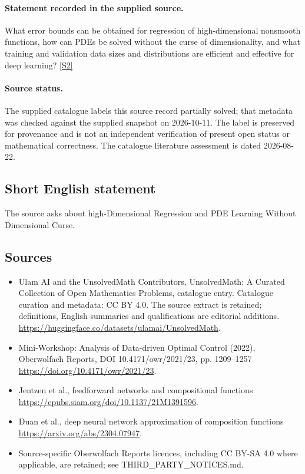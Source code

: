 \documentclass[11pt]{article}
\begin{document}
\paragraph{Statement recorded in the supplied source.}
What error bounds can be obtained for regression of high-dimensional nonsmooth functions, how can PDEs be solved without the curse of dimensionality, and what training and validation data sizes and distributions are efficient and effective for deep learning? \href{https://doi.org/10.4171/owr/2021/23}{[S2]}
\paragraph{Source status.}
The supplied catalogue labels this source record partially solved; that metadata was checked against the supplied snapshot on 2026-10-11. The label is preserved for provenance and is not an independent verification of present open status or mathematical correctness. The catalogue literature assessment is dated 2026-08-22.
\subsection{Short English statement}
The source asks about high-Dimensional Regression and PDE Learning Without Dimensional Curse.
\subsection{Sources}
\begin{itemize}
\item[S1] Ulam AI and the UnsolvedMath Contributors, UnsolvedMath: A Curated Collection of Open Mathematics Problems, catalogue entry. Catalogue curation and metadata: CC BY 4.0. The source extract is retained; definitions, English summaries and qualifications are editorial additions.
\url{https://huggingface.co/datasets/ulamai/UnsolvedMath}.
\item[S2] Mini-Workshop: Analysis of Data-driven Optimal Control (2022), Oberwolfach Reports, DOI 10.4171/owr/2021/23, pp. 1209--1257
\url{https://doi.org/10.4171/owr/2021/23}.
\item[S3] Jentzen et al., feedforward networks and compositional functions
\url{https://epubs.siam.org/doi/10.1137/21M1391596}.
\item[S4] Duan et al., deep neural network approximation of composition functions
\url{https://arxiv.org/abs/2304.07947}.
\item Source-specific Oberwolfach Reports licences, including CC BY-SA 4.0 where applicable, are retained; see THIRD\_PARTY\_NOTICES.md.
\end{itemize}
\end{document}
